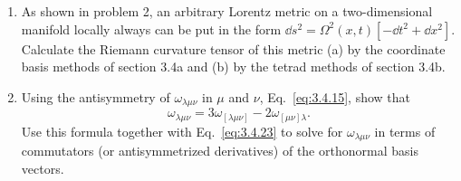 \begin{enumerate}[label=\arabic*.,leftmargin=*]
\item As shown in problem 2, an arbitrary Lorentz metric on a two-dimensional manifold locally always can be put in the form $\dd s^2=\Omega^2(x,t)[-\dd t^2+\dd x^2]$. Calculate
the Riemann curvature tensor of this metric (a) by the coordinate basis methods of
section 3.4a and (b) by the tetrad methods of section 3.4b.

\item Using the antisymmetry of $\omega_{\lambda\mu\nu}$ in $\mu$ and $\nu$, Eq.~\eqref{eq:3.4.15}, show that
\[
  \omega_{\lambda\mu\nu}
  =3\omega_{[\lambda\mu\nu]}-2\omega_{[\mu\nu]\lambda}.
\]
Use this formula together with Eq.~\eqref{eq:3.4.23} to solve for $\omega_{\lambda\mu\nu}$ in terms of
commutators (or antisymmetrized derivatives) of the orthonormal basis vectors.
\end{enumerate}
